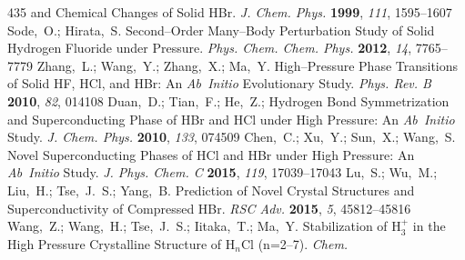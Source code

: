 \documentclass[12pt,letterpaper,oneside]{article}
\begin{document}
\begin{mcitethebibliography}{435}
  and Chemical Changes of Solid HBr. \emph{J. Chem. Phys.} \textbf{1999},
  \emph{111}, 1595--1607\relax
\mciteBstWouldAddEndPuncttrue
\mciteSetBstMidEndSepPunct{\mcitedefaultmidpunct}
{\mcitedefaultendpunct}{\mcitedefaultseppunct}\relax
\EndOfBibitem
{}
Sode,~O.; Hirata,~S. Second--Order Many--Body Perturbation Study of Solid
  Hydrogen Fluoride under Pressure. \emph{Phys. Chem. Chem. Phys.}
  \textbf{2012}, \emph{14}, 7765--7779\relax
\mciteBstWouldAddEndPuncttrue
\mciteSetBstMidEndSepPunct{\mcitedefaultmidpunct}
{\mcitedefaultendpunct}{\mcitedefaultseppunct}\relax
\EndOfBibitem
{}
Zhang,~L.; Wang,~Y.; Zhang,~X.; Ma,~Y. High--Pressure Phase Transitions of
  Solid HF, HCl, and HBr: An \emph{Ab~Initio} Evolutionary Study. \emph{Phys. Rev.
  B} \textbf{2010}, \emph{82}, 014108\relax
\mciteBstWouldAddEndPuncttrue
\mciteSetBstMidEndSepPunct{\mcitedefaultmidpunct}
{\mcitedefaultendpunct}{\mcitedefaultseppunct}\relax
\EndOfBibitem
{}
Duan,~D.; Tian,~F.; He,~Z.;   Hydrogen Bond
  Symmetrization and Superconducting Phase of HBr and HCl under High Pressure:
  An \emph{Ab~Initio} Study. \emph{J. Chem. Phys.} \textbf{2010}, \emph{133},
  074509\relax
\mciteBstWouldAddEndPuncttrue
\mciteSetBstMidEndSepPunct{\mcitedefaultmidpunct}
{\mcitedefaultendpunct}{\mcitedefaultseppunct}\relax
\EndOfBibitem
{}
Chen,~C.; Xu,~Y.; Sun,~X.; Wang,~S. Novel Superconducting Phases of HCl and HBr
  under High Pressure: An \emph{Ab~Initio} Study. \emph{J. Phys. Chem. C}
  \textbf{2015}, \emph{119}, 17039--17043\relax
\mciteBstWouldAddEndPuncttrue
\mciteSetBstMidEndSepPunct{\mcitedefaultmidpunct}
{\mcitedefaultendpunct}{\mcitedefaultseppunct}\relax
\EndOfBibitem
{}
Lu,~S.; Wu,~M.; Liu,~H.; Tse,~J.~S.; Yang,~B. Prediction of Novel Crystal
  Structures and Superconductivity of Compressed HBr. \emph{RSC Adv.}
  \textbf{2015}, \emph{5}, 45812--45816\relax
\mciteBstWouldAddEndPuncttrue
\mciteSetBstMidEndSepPunct{\mcitedefaultmidpunct}
{\mcitedefaultendpunct}{\mcitedefaultseppunct}\relax
\EndOfBibitem
{}
Wang,~Z.; Wang,~H.; Tse,~J.~S.; Iitaka,~T.; Ma,~Y. Stabilization of H$_{3}^{+}$
  in the High Pressure Crystalline Structure of H$_n$Cl (n=2--7). \emph{Chem.
}
\end{mcitethebibliography}
\end{document}
